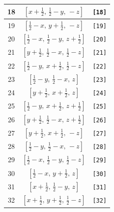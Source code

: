 \documentclass[fleqn,8pt]{jsarticle}
\begin{document}
\begin{longtable}{ccc}
18 & $\left[ x + \frac{1}{2},\, \frac{1}{2} - y,\, - z \right]$ & {\tt [18]} \\ \hline
19 & $\left[ \frac{1}{2} - x,\, y + \frac{1}{2},\, - z \right]$ & {\tt [19]} \\ \hline
20 & $\left[ \frac{1}{2} - x,\, \frac{1}{2} - y,\, z + \frac{1}{2} \right]$ & {\tt [20]} \\ \hline
21 & $\left[ y + \frac{1}{2},\, \frac{1}{2} - x,\, \frac{1}{2} - z \right]$ & {\tt [21]} \\ \hline
22 & $\left[ \frac{1}{2} - y,\, x + \frac{1}{2},\, \frac{1}{2} - z \right]$ & {\tt [22]} \\ \hline
23 & $\left[ \frac{1}{2} - y,\, \frac{1}{2} - x,\, z \right]$ & {\tt [23]} \\ \hline
24 & $\left[ y + \frac{1}{2},\, x + \frac{1}{2},\, z \right]$ & {\tt [24]} \\ \hline
25 & $\left[ \frac{1}{2} - y,\, x + \frac{1}{2},\, z + \frac{1}{2} \right]$ & {\tt [25]} \\ \hline
26 & $\left[ y + \frac{1}{2},\, \frac{1}{2} - x,\, z + \frac{1}{2} \right]$ & {\tt [26]} \\ \hline
27 & $\left[ y + \frac{1}{2},\, x + \frac{1}{2},\, - z \right]$ & {\tt [27]} \\ \hline
28 & $\left[ \frac{1}{2} - y,\, \frac{1}{2} - x,\, - z \right]$ & {\tt [28]} \\ \hline
29 & $\left[ \frac{1}{2} - x,\, \frac{1}{2} - y,\, \frac{1}{2} - z \right]$ & {\tt [29]} \\ \hline
30 & $\left[ \frac{1}{2} - x,\, y + \frac{1}{2},\, z \right]$ & {\tt [30]} \\ \hline
31 & $\left[ x + \frac{1}{2},\, \frac{1}{2} - y,\, z \right]$ & {\tt [31]} \\ \hline
32 & $\left[ x + \frac{1}{2},\, y + \frac{1}{2},\, \frac{1}{2} - z \right]$ & {\tt [32]} \\
\end{longtable}
\end{document}
